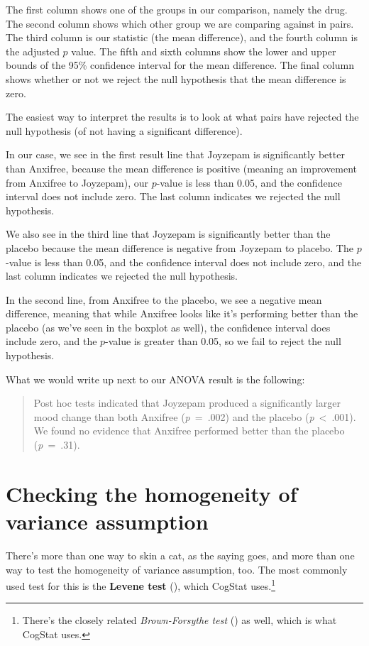 \documentclass[
  11pt,
  a4paper,
  twoside,symmetric,openright]{book}
\theoremstyle{break}
\theoremstyle{break}
\begin{document}
The first column shows one of the groups in our comparison, namely the drug. The second column shows which other group we are comparing against in pairs. The third column is our statistic (the mean difference), and the fourth column is the adjusted \(p\) value. The fifth and sixth columns show the lower and upper bounds of the 95\% confidence interval for the mean difference. The final column shows whether or not we reject the null hypothesis that the mean difference is zero.

The easiest way to interpret the results is to look at what pairs have rejected the null hypothesis (of not having a significant difference).

In our case, we see in the first result line that Joyzepam is significantly better than Anxifree, because the mean difference is positive (meaning an improvement from Anxifree to Joyzepam), our \(p\)-value is less than 0.05, and the confidence interval does not include zero. The last column indicates we rejected the null hypothesis.

We also see in the third line that Joyzepam is significantly better than the placebo because the mean difference is negative from Joyzepam to placebo. The \(p\)-value is less than 0.05, and the confidence interval does not include zero, and the last column indicates we rejected the null hypothesis.

In the second line, from Anxifree to the placebo, we see a negative mean difference, meaning that while Anxifree looks like it's performing better than the placebo (as we've seen in the boxplot as well), the confidence interval does include zero, and the \(p\)-value is greater than 0.05, so we fail to reject the null hypothesis.

What we would write up next to our ANOVA result is the following:

\begin{quote}
Post hoc tests indicated that Joyzepam produced a significantly larger mood change than both Anxifree (\emph{p}~=~.002) and the placebo (\emph{p}~\textless~.001). We found no evidence that Anxifree performed better than the placebo (\emph{p}~=~.31).
\end{quote}

\section{Checking the homogeneity of variance assumption}\label{levene}

There's more than one way to skin a cat, as the saying goes, and more than one way to test the homogeneity of variance assumption, too. The most commonly used test for this is the \textbf{Levene test} (), which CogStat uses.\footnote{There's the closely related \emph{Brown-Forsythe test} () as well, which is what CogStat uses.}
\end{document}
